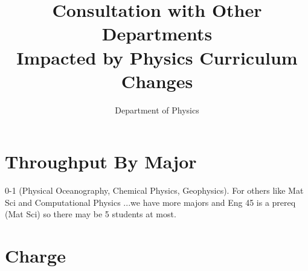 \documentclass[12pt]{article}
\begin{document}

\title{Consultation with Other Departments \\ Impacted by Physics Curriculum Changes}
\author{Department of Physics}

\maketitle

\section{Throughput By Major}

0-1 (Physical Oceanography, Chemical Physics, Geophysics).  For others
like Mat Sci and Computational Physics ...we have more majors and Eng 45
is a prereq (Mat Sci) so there may be 5 students at most.

\section{Charge}
\end{document}
